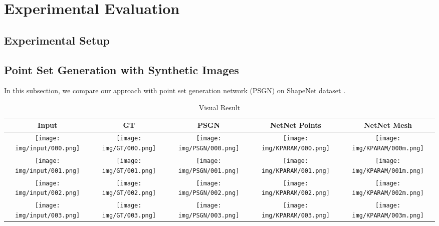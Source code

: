 \section{Experimental Evaluation}
\subsection{Experimental Setup}
\subsection{Point Set Generation with Synthetic Images}
In this subsection, we compare our approach with point set generation network (PSGN)\cite{PSGN} on ShapeNet dataset \cite{shapenetdata}. 
\begin{table*}
	\centering
	\begin{tabular}{c c c c c}
		Input & GT & PSGN\cite{PSGN} & NetNet Points & NetNet Mesh \\
		\hline
		\texttt{[image: img/input/000.png]}&
		\texttt{[image: img/GT/000.png]}&
		\texttt{[image: img/PSGN/000.png]}&
		\texttt{[image: img/KPARAM/000.png]}&
		\texttt{[image: img/KPARAM/000m.png]}\\
		\texttt{[image: img/input/001.png]}&
		\texttt{[image: img/GT/001.png]}&
		\texttt{[image: img/PSGN/001.png]}&
		\texttt{[image: img/KPARAM/001.png]}&
		\texttt{[image: img/KPARAM/001m.png]}\\
		\texttt{[image: img/input/002.png]}&
		\texttt{[image: img/GT/002.png]}&
		\texttt{[image: img/PSGN/002.png]}&
		\texttt{[image: img/KPARAM/002.png]}&
		\texttt{[image: img/KPARAM/002m.png]}\\
		\texttt{[image: img/input/003.png]}&
		\texttt{[image: img/GT/003.png]}&
		\texttt{[image: img/PSGN/003.png]}&
		\texttt{[image: img/KPARAM/003.png]}&
		\texttt{[image: img/KPARAM/003m.png]}\\
	\end{tabular}
	\caption{Visual Result}
	\label{tab:vis}
\end{table*}
